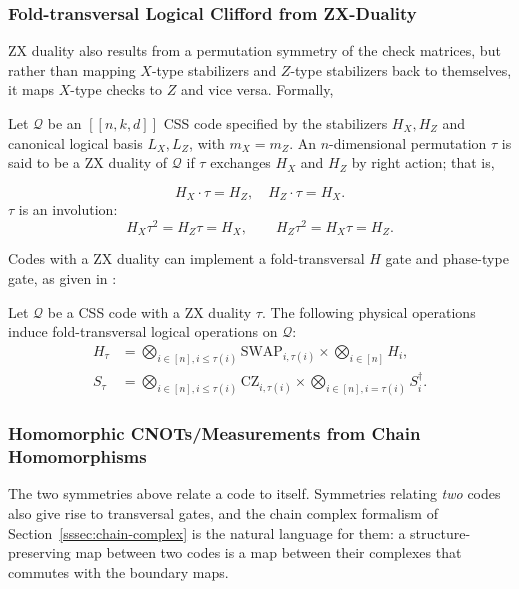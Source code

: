 \subsubsection{Fold-transversal Logical Clifford from ZX-Duality}
ZX duality also results from a permutation symmetry of the check matrices, but rather than mapping $X$-type stabilizers and $Z$-type stabilizers back to themselves, it maps $X$-type checks to $Z$ and vice versa. Formally,
\begin{definition}[ZX Duality]\label{def:zx-duality}
Let $\mathcal{Q}$ be an $[[n,k,d]]$ CSS code specified by the stabilizers $H_X, H_Z$ and canonical logical basis $L_X, L_Z$, with $m_X = m_Z$. An $n$-dimensional permutation $\tau$ is said to be a ZX duality of $\mathcal{Q}$ if $\tau$ exchanges $H_X$ and $H_Z$ by right action; that is,

\[
H_X\cdot \tau = H_Z,  \quad H_Z\cdot\tau  = H_X.
\]
 $\tau$ is an involution:
\[
H_X\tau^2 = H_Z\tau = H_X,\qquad H_Z\tau^2 = H_X\tau = H_Z.
\]
\end{definition}

Codes with a ZX duality can implement a fold-transversal $H$ gate and phase-type gate, as given in \cite{Breuckmann_2024}:

\begin{fact}\label{fact:fold-transversal}
Let $\mathcal Q$ be a CSS code with a ZX duality $\tau$. The following physical operations induce fold-transversal logical operations on $\mathcal Q$:
\begin{align}
    H_\tau &= \bigotimes_{i \in [n],i\leq \tau(i)} \mathrm{SWAP}_{i, \tau(i)} \times \bigotimes_{i \in [n]} H_i,\\
    S_\tau &= \bigotimes_{i \in [n],i\leq \tau(i)} \mathrm{CZ}_{i, \tau(i)} \times \bigotimes_{i \in [n], i = \tau(i)} S_i^\dagger.
\end{align}

\end{fact}


\subsubsection{Homomorphic CNOTs/Measurements from Chain Homomorphisms}
 
The two symmetries above relate a code to itself. Symmetries relating \emph{two} codes also give
rise to transversal gates, and the chain complex formalism of Section~\ref{sssec:chain-complex} is
the natural language for them: a structure-preserving map between two codes is a map between their
complexes that commutes with the boundary maps.
 
